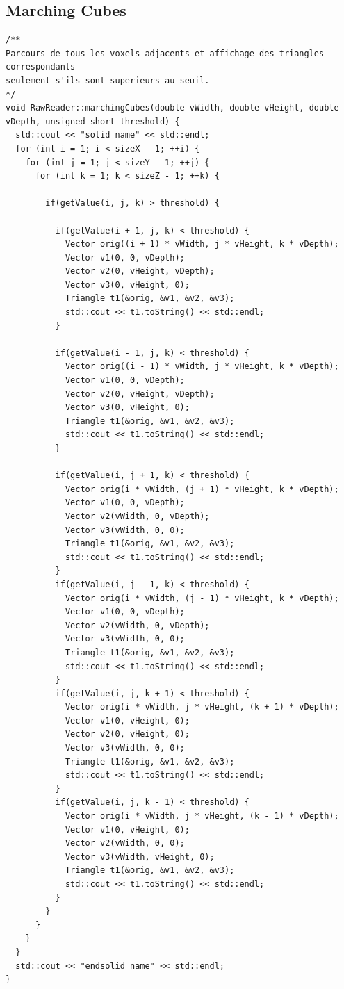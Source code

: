 \documentclass [a4 paper,11pt]{report}
\begin{document}
\subsection*{Marching Cubes}
\begin{lstlisting}
/**
Parcours de tous les voxels adjacents et affichage des triangles correspondants
seulement s'ils sont superieurs au seuil.
*/
void RawReader::marchingCubes(double vWidth, double vHeight, double vDepth, unsigned short threshold) {
  std::cout << "solid name" << std::endl;
  for (int i = 1; i < sizeX - 1; ++i) {
    for (int j = 1; j < sizeY - 1; ++j) {
      for (int k = 1; k < sizeZ - 1; ++k) {

        if(getValue(i, j, k) > threshold) {

          if(getValue(i + 1, j, k) < threshold) {
            Vector orig((i + 1) * vWidth, j * vHeight, k * vDepth);
            Vector v1(0, 0, vDepth);
            Vector v2(0, vHeight, vDepth);
            Vector v3(0, vHeight, 0);
            Triangle t1(&orig, &v1, &v2, &v3);
            std::cout << t1.toString() << std::endl;
          }

          if(getValue(i - 1, j, k) < threshold) {
            Vector orig((i - 1) * vWidth, j * vHeight, k * vDepth);
            Vector v1(0, 0, vDepth);
            Vector v2(0, vHeight, vDepth);
            Vector v3(0, vHeight, 0);
            Triangle t1(&orig, &v1, &v2, &v3);
            std::cout << t1.toString() << std::endl;
          }

          if(getValue(i, j + 1, k) < threshold) {
            Vector orig(i * vWidth, (j + 1) * vHeight, k * vDepth);
            Vector v1(0, 0, vDepth);
            Vector v2(vWidth, 0, vDepth);
            Vector v3(vWidth, 0, 0);
            Triangle t1(&orig, &v1, &v2, &v3);
            std::cout << t1.toString() << std::endl;
          }
          if(getValue(i, j - 1, k) < threshold) {
            Vector orig(i * vWidth, (j - 1) * vHeight, k * vDepth);
            Vector v1(0, 0, vDepth);
            Vector v2(vWidth, 0, vDepth);
            Vector v3(vWidth, 0, 0);
            Triangle t1(&orig, &v1, &v2, &v3);
            std::cout << t1.toString() << std::endl;
          }
          if(getValue(i, j, k + 1) < threshold) {
            Vector orig(i * vWidth, j * vHeight, (k + 1) * vDepth);
            Vector v1(0, vHeight, 0);
            Vector v2(0, vHeight, 0);
            Vector v3(vWidth, 0, 0);
            Triangle t1(&orig, &v1, &v2, &v3);
            std::cout << t1.toString() << std::endl;
          }
          if(getValue(i, j, k - 1) < threshold) {
            Vector orig(i * vWidth, j * vHeight, (k - 1) * vDepth);
            Vector v1(0, vHeight, 0);
            Vector v2(vWidth, 0, 0);
            Vector v3(vWidth, vHeight, 0);
            Triangle t1(&orig, &v1, &v2, &v3);
            std::cout << t1.toString() << std::endl;
          }
        }
      }
    }
  }
  std::cout << "endsolid name" << std::endl;
}
\end{lstlisting}
\end{document}
